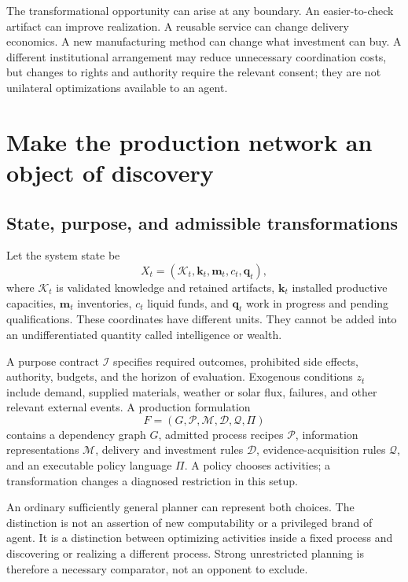 \documentclass[11pt,letterpaper]{article}
\newcommand{\I}{\mathcal I}\newcommand{\A}{\mathcal A}
\newcommand{\K}{\mathcal K}\newcommand{\Rset}{\mathcal R}
\newcommand{\1}{\mathbf 1}
\theoremstyle{remark}\newtheorem{remark}{Remark}[section]
\begin{document}
The transformational opportunity can arise at any boundary. An easier-to-check artifact can improve realization. A reusable service can change delivery economics. A new manufacturing method can change what investment can buy. A different institutional arrangement may reduce unnecessary coordination costs, but changes to rights and authority require the relevant consent; they are not unilateral optimizations available to an agent.

\section{Make the production network an object of discovery}\label{sec:model}
\subsection{State, purpose, and admissible transformations}
Let the system state be
\begin{equation}
 X_t=(\K_t,\mathbf k_t,\mathbf m_t,c_t,\mathbf q_t),
\end{equation}
where $\K_t$ is validated knowledge and retained artifacts, $\mathbf k_t$ installed productive capacities, $\mathbf m_t$ inventories, $c_t$ liquid funds, and $\mathbf q_t$ work in progress and pending qualifications. These coordinates have different units. They cannot be added into an undifferentiated quantity called intelligence or wealth.

A purpose contract $\I$ specifies required outcomes, prohibited side effects, authority, budgets, and the horizon of evaluation. Exogenous conditions $z_t$ include demand, supplied materials, weather or solar flux, failures, and other relevant external events. A production formulation
\begin{equation}
 F=(G,\mathcal P,\mathcal M,\mathcal D,\mathcal Q,\Pi)
\end{equation}
contains a dependency graph $G$, admitted process recipes $\mathcal P$, information representations $\mathcal M$, delivery and investment rules $\mathcal D$, evidence-acquisition rules $\mathcal Q$, and an executable policy language $\Pi$. A policy chooses activities; a transformation changes a diagnosed restriction in this setup.

An ordinary sufficiently general planner can represent both choices. The distinction is not an assertion of new computability or a privileged brand of agent. It is a distinction between optimizing activities inside a fixed process and discovering or realizing a different process. Strong unrestricted planning is therefore a necessary comparator, not an opponent to exclude.
\end{document}

